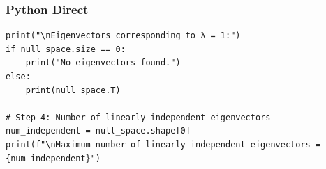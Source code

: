 \documentclass{beamer}
\begin{document}
\begin{frame}[fragile]
\frametitle{Python Direct}
\begin{lstlisting}
print("\nEigenvectors corresponding to λ = 1:")
if null_space.size == 0:
    print("No eigenvectors found.")
else:
    print(null_space.T)

# Step 4: Number of linearly independent eigenvectors
num_independent = null_space.shape[0]
print(f"\nMaximum number of linearly independent eigenvectors = {num_independent}")

\end{lstlisting}
\end{frame}
\end{document}
